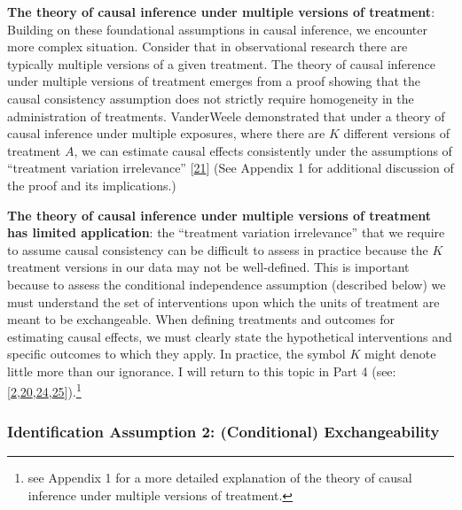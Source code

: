 \documentclass[
  singlecolumn]{article}
\begin{document}
\textbf{The theory of causal inference under multiple versions of
treatment}: Building on these foundational assumptions in causal
inference, we encounter more complex situation. Consider that in
observational research there are typically multiple versions of a given
treatment. The theory of causal inference under multiple versions of
treatment emerges from a proof showing that the causal consistency
assumption does not strictly require homogeneity in the administration
of treatments. VanderWeele demonstrated that under a theory of causal
inference under multiple exposures, where there are \(K\) different
versions of treatment \(A\), we can estimate causal effects consistently
under the assumptions of ``treatment variation irrelevance''
{[}\protect\hyperlink{ref-vanderweele2009}{21}{]} (See Appendix 1 for
additional discussion of the proof and its implications.)

\textbf{The theory of causal inference under multiple versions of
treatment has limited application}: the ``treatment variation
irrelevance'' that we require to assume causal consistency can be
difficult to assess in practice because the \(K\) treatment versions in
our data may not be well-defined. This is important because to assess
the conditional independence assumption (described below) we must
understand the set of interventions upon which the units of treatment
are meant to be exchangeable. When defining treatments and outcomes for
estimating causal effects, we must clearly state the hypothetical
interventions and specific outcomes to which they apply. In practice,
the symbol \(K\) m️ight denote little more than our ignorance. I will
return to this topic in Part 4 (see:
{[}\protect\hyperlink{ref-bulbulia2022}{2},\protect\hyperlink{ref-murray2021a}{20},\protect\hyperlink{ref-hernuxe1n2022a}{24},\protect\hyperlink{ref-hernuxe1n2008}{25}{]}).\footnote{see
  Appendix 1 for a more detailed explanation of the theory of causal
  inference under multiple versions of treatment.}

\hypertarget{identification-assumption-2-conditional-exchangeability}{%
\subsubsection{Identification Assumption 2: (Conditional)
Exchangeability}\label{identification-assumption-2-conditional-exchangeability}}
\end{document}
